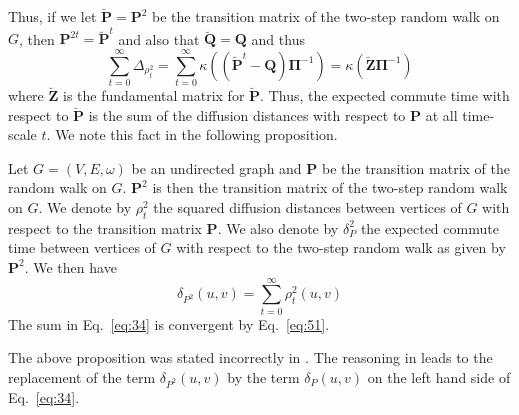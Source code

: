 Thus, if we let $\breve{\mathbf{P}} = \mathbf{P}^{2}$ be the transition matrix
of the two-step random walk on $G$, then $\mathbf{P}^{2t} =
\breve{\mathbf{P}}^{t}$ and also that $\breve{\mathbf{Q}} = \mathbf{Q}$ and thus
\begin{equation}
  \label{eq:51}
  \sum_{t = 0}^{\infty} \Delta_{\rho_{t}^{2}} = \sum_{t = 0}^{\infty}
  \kappa((\breve{\mathbf{P}}^{t} - \mathbf{Q})\bm{\Pi}^{-1}) =
  \kappa(\breve{\mathbf{Z}} \bm{\Pi}^{-1})
\end{equation}
where $\breve{\mathbf{Z}}$ is the fundamental matrix for
$\breve{\mathbf{P}}$. Thus, the expected commute time with respect to
$\breve{\mathbf{P}}$ is the
sum of the diffusion distances with respect to $\mathbf{P}$ at all
time-scale $t$. We note this fact in the following proposition.
\begin{proposition}
  \label{prop:17}
  Let $G = (V,E,\omega)$ be an undirected graph and $\mathbf{P}$ be
  the transition matrix of the random walk on $G$. $\mathbf{P}^{2}$ is
  then the transition matrix of the two-step random
  walk on $G$. We denote by $\rho_{t}^{2}$ the squared diffusion
  distances between vertices of $G$ with respect to the transition
  matrix $\mathbf{P}$. We also denote by $\delta_P^{2}$ the expected commute time
  between vertices of $G$ with respect to the two-step random walk as
  given by $\mathbf{P}^{2}$. We then have
  \begin{equation}
    \label{eq:34}
    \delta_{P^{2}}(u,v) = \sum_{t = 0}^{\infty}{\rho_{t}^{2}(u,v)}
  \end{equation}
  The sum in Eq.~\eqref{eq:34} is convergent by Eq.~\eqref{eq:51}.
\end{proposition}
The above proposition was stated incorrectly in 
\citep{qui07:_clust}. The reasoning in
\citep{qui07:_clust} leads to the replacement of the term
$\delta_{P^2}(u,v)$ by the term $\delta_{P}(u,v)$ on the left hand
side of Eq.~\eqref{eq:34}.
